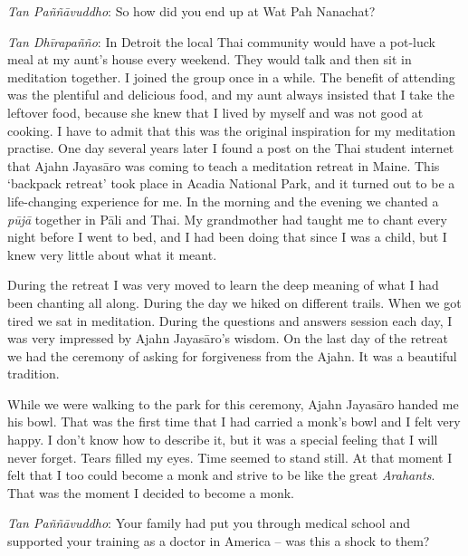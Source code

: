\emph{Tan Paññāvuddho}: So how did you end up at Wat Pah Nanachat? 

\emph{Tan Dhīrapañño}: In Detroit the local Thai community would have a
pot-luck meal at my aunt's house every weekend. They would talk and then
sit in meditation together. I joined the group once in a while. The
benefit of attending was the plentiful and delicious food, and my aunt
always insisted that I take the leftover food, because she knew that I
lived by myself and was not good at cooking. I have to admit that this
was the original inspiration for my meditation practise. One day several
years later I found a post on the Thai student internet that Ajahn
Jayasāro was coming to teach a meditation retreat in Maine. This
`backpack retreat' took place in Acadia National Park, and it turned out
to be a life-changing experience for me. In the morning and the evening
we chanted a \emph{pūjā} together in Pāli and Thai. My grandmother had
taught me to chant every night before I went to bed, and I had been
doing that since I was a child, but I knew very little about what it
meant.

During the retreat I was very moved to learn the deep meaning of
what I had been chanting all along. During the day we hiked on different
trails. When we got tired we sat in meditation. During the questions and
answers session each day, I was very impressed by Ajahn Jayasāro's
wisdom. On the last day of the retreat we had the ceremony of asking for
forgiveness from the Ajahn. It was a beautiful tradition.

While we were
walking to the park for this ceremony, Ajahn Jayasāro handed me his
bowl. That was the first time that I had carried a monk's bowl and I
felt very happy. I don't know how to describe it, but it was a special
feeling that I will never forget. Tears filled my eyes. Time seemed to
stand still. At that moment I felt that I too could become a monk and
strive to be like the great \emph{Arahants}. That was the moment I
decided to become a monk. 

\emph{Tan Paññāvuddho}: Your family had put you through medical school
and supported your training as a doctor in America -- was this a shock
to them? 

